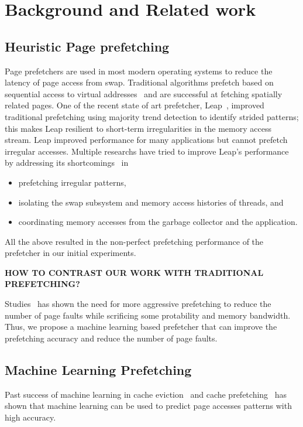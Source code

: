 \section{Background and Related work} \label{sec:2}

\subsection{Heuristic Page prefetching}
Page prefetchers are used in most modern operating systems to reduce the latency of page access from swap. 
Traditional algorithms prefetch based on sequential access to virtual addresses~\cite{vma-readahead, vm_fault_readahead} and are successful at fetching spatially related pages. 
One of the recent state of art prefetcher, Leap~\cite{leap}, improved traditional prefetching using majority trend detection to identify strided patterns; this makes Leap resilient to short-term irregularities in the memory access stream.
Leap improved performance for many applications but cannot prefetch irregular accesses. 
Multiple researchs have tried to improve Leap's performance by addressing its shortcomings~\cite{canvas, dilos, memliner} in \begin{itemize}
    \item prefetching irregular patterns,
    \item isolating the swap subsystem and memory access histories of threads, and
    \item coordinating memory accesses from the garbage collector and the application.
\end{itemize}

All the above resulted in the non-perfect prefetching performance of the prefetcher in our initial experiments.

\textbf{HOW TO CONTRAST OUR WORK WITH TRADITIONAL PREFETCHING?}

Studies~\cite{Aggressive} has shown the need for more aggressive prefetching to reduce the number of page faults while scrificing some protability and memory bandwidth. Thus, we propose a machine learning based prefetcher that can improve the prefetching accuracy and reduce the number of page faults.

\subsection{Machine Learning Prefetching}
Past success of machine learning in cache eviction~\cite{RelaxedBelady} and cache prefetching~\cite{LMAP} has shown that machine learning can be used to predict page accesses patterns with high accuracy.

